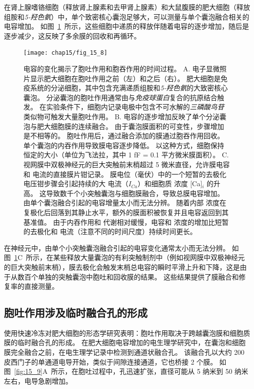在肾上腺嗜铬细胞（释放肾上腺素和去甲肾上腺素）和大鼠腹膜的肥大细胞（释放组胺和\textit{5-羟色氨}）中，单个致密核心囊泡足够大，可以测量与单个囊泡融合相关的电容增加。
如图~\ref{fig:15_8}~所示，这些细胞中递质的释放伴随着电容的逐步增加，随后是逐步减少，这反映了多余膜的回收和再循环。


\begin{figure}[htbp]
	\centering
	\texttt{[image: chap15/fig\_15\_8]}
	\caption{电容的变化揭示了胞吐作用和胞吞作用的时间过程。
		A. 电子显微照片显示肥大细胞在胞吐作用之前（左）和之后（右）。
		肥大细胞是免疫系统的分泌细胞，其中包含充满递质组胺和\textit{5-羟色氨}的大致密核心囊泡。
		分泌囊泡的胞吐作用通常由与\textit{免疫球蛋白}复合的抗原结合触发。
		在实验条件下，细胞内记录电极中包含不可水解的\textit{三磷酸鸟苷}类似物可触发大量胞吐作用。
		B. 电容的逐步增加反映了单个分泌囊泡与肥大细胞膜的连续融合。
		由于囊泡膜面积的可变性，步骤增加是不相等的。
		胞吐作用后，通过融合添加的膜通过胞吞作用回收。
		单个囊泡的内吞作用导致膜电容逐步降低。
		以这种方式，细胞保持恒定的大小（单位为飞法拉，其中 1 fF = 0.1 平方微米膜面积）\cite{fernandez1984capacitance}。
		C. 视网膜中双极神经元的巨大突触前末梢超过 5 微米直径，允许膜电容和  电流的直接膜片钳记录。
		膜电位（毫伏）中的一个短暂的去极化电压钳步骤会引起持续的大  电流（$I_{Ca}$）和细胞质  浓度 [Ca]$_i$ 的升高。
		这导致数千个小突触囊泡与细胞膜融合，导致总膜电容增加。
		由单个囊泡融合引起的电容增量太小而无法分辨。
		随着内部  浓度在复极化后回落到其静止水平，额外的膜面积被恢复并且电容返回到其基准值。
		由于内吞作用和  代谢相对缓慢，电容和  浓度的增加比短暂的去极化和  电流（注意不同的时间尺度）持续时间更长\cite{zenisek2004visualizing}。}
	\label{fig:15_8}
\end{figure}


在神经元中，由单个小突触囊泡融合引起的电容变化通常太小而无法分辨。
如图~\ref{fig:15_8}C~所示，在某些释放大量囊泡的有利突触制剂中（例如视网膜中双极神经元的巨大突触前末梢），膜去极化会触发末梢总电容的瞬时平滑上升和下降，这是由于从数百个单独的突触囊泡中胞吐和回收膜的结果。
这些结果提供了膜融合和修复率的直接测量。



\subsection{胞吐作用涉及临时融合孔的形成}

使用快速冷冻对肥大细胞的形态学研究表明：胞吐作用取决于跨越囊泡膜和细胞质膜的临时融合孔的形成。
在肥大细胞电容增加的电生理学研究中，在囊泡和细胞膜完全融合之前，在电生理学记录中检测到通道状融合孔。 
该融合孔以大约 200 皮西门子的单通道电导开始，类似于间隙连接通道，它也桥接 2 个膜。
如图~\ref{fig:15_9}A~所示，在胞吐过程中，孔迅速扩张，直径可能从 5 纳米到 50 纳米左右，电导急剧增加。


